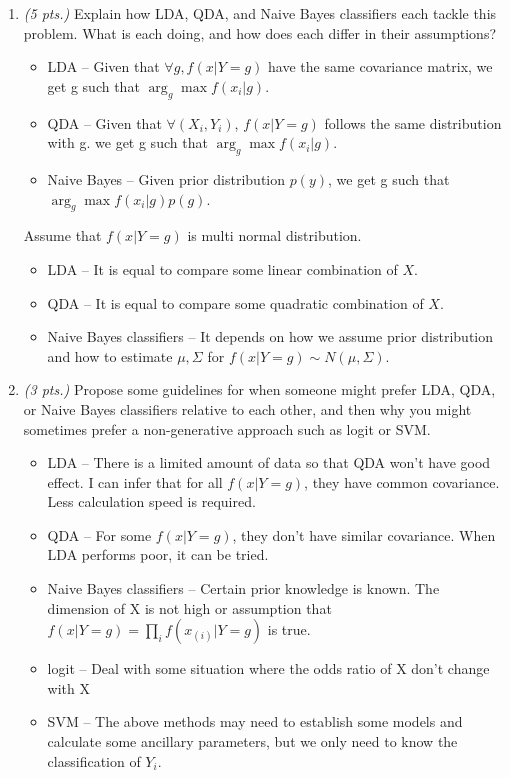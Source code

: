 \documentclass[11pt,english]{article}
\begin{document}
\begin{enumerate}
\begin{enumerate}
\item \textit{(5 pts.)} Explain how LDA, QDA, and Naive Bayes classifiers each tackle this problem. What is each doing, and how does each differ in their assumptions?
\begin{itemize}
  \item LDA -- Given that $\forall g, f(x|Y=g)$ have the same covariance matrix, we get g such that $\mathop{arg}_{g} \max f(x_i|g)$. 
  \item QDA -- Given that $\forall (X_i, Y_i)$, $f(x|Y=g)$ follows the same distribution with g.  we get g such that $\mathop{arg}_{g} \max f(x_i|g)$.
  \item Naive Bayes -- Given prior distribution $p(y)$, we get g such that  $ \mathop{arg}_{g} \max f(x_i|g)p(g) $.
\end{itemize}
Assume that $f(x|Y=g)$ is multi normal distribution.  
\begin{itemize}
  \item LDA -- It is equal to compare some linear combination of $X$.
  \item QDA -- It is equal to compare some quadratic combination of $X$.
  \item Naive Bayes classifiers -- It depends on how we assume prior distribution and how to estimate $\mu, \Sigma$ for $f(x|Y=g) \sim N(\mu,\Sigma)$.
\end{itemize}

\item \textit{(3 pts.)} Propose some guidelines for when someone might prefer LDA, QDA, or Naive Bayes classifiers relative to each other, and then why you might sometimes prefer a non-generative approach such as logit or SVM.
    
\begin{itemize}
  \item LDA -- There is a limited amount of data so that QDA won't have good effect.  I can infer that for all $f(x|Y=g)$, they have common covariance. Less calculation speed is required.
  \item QDA -- For some $f(x|Y=g)$, they don't have similar covariance.  When LDA performs poor, it can be tried.  
  \item Naive Bayes classifiers -- Certain prior knowledge is known.  The dimension of X is not high or assumption that $f(x|Y=g) = \prod_i f(x_{(i)}|Y=g)$ is true.
  \item logit -- Deal with some situation where the odds ratio of X don't change with X
  \item SVM -- The above methods may need to establish some models and calculate some ancillary parameters, but we only need to know the classification of $Y_i$.


\end{itemize}
\end{enumerate}
\end{enumerate}
\end{document}
